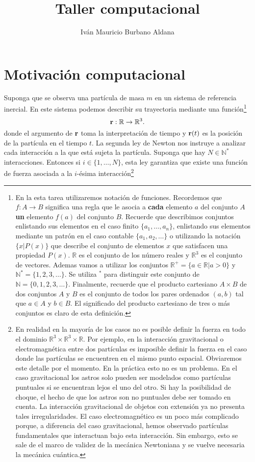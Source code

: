 \documentclass{article}
\title{Taller computacional}
\author{Iván Mauricio Burbano Aldana}
\begin{document}
\maketitle

\section{Motivación computacional}\label{sec:motivacion}

Suponga que se observa una partícula de masa $m$ en un sistema de referencia inercial. En este sistema podemos describir su trayectoria mediante una función\footnote{En la esta tarea utilizaremos notación de funciones. Recordemos que $f:A\rightarrow B$ significa una regla que le asocia a \textbf{cada} elemento $a$ del conjunto $A$ \textbf{un} elemento $f(a)$ del conjunto $B$. Recuerde que describimos conjuntos enlistando sus elementos en el caso finito $\{a_1,\dots,a_n\}$, enlistando sus elementos mediante un patrón  en el caso contable $\{a_1,a_2,\dots\}$ o utilizando la notación $\{x|P(x)\}$ que describe el conjunto de elementos $x$ que satisfacen una propiedad $P(x)$. $\mathbb{R}$ es el conjunto de los número reales y $\mathbb{R}^3$ es el conjunto de vectores. Ademas vamos a utilizar los conjuntos $\mathbb{R}^+=\{a\in\mathbb{R}|a>0\}$ y $\mathbb{N}^*=\{1,2,3,\dots\}$. Se utiliza $^*$ para distinguir este conjunto de $\mathbb{N}=\{0,1,2,3,\dots\}$. Finalmente, recuerde que el producto cartesiano $A\times B$ de dos conjuntos $A$ y $B$ es el conjunto de todos los pares ordenados $(a,b)$ tal que $a\in A$ y $b\in B$. El significado del producto cartesiano de tres o más conjuntos es claro de esta definición.} 
\begin{equation}\label{ec:trayectoria}
\vb{r}:\mathbb{R}\rightarrow\mathbb{R}^3.
\end{equation}
donde el argumento de $\vb{r}$ toma la interpretación de tiempo y $\vb{r}(t)$ es la posición de la partícula en el tiempo $t$. La segunda ley de Newton nos instruye a analizar cada interacción a la que está sujeta la partícula. Suponga que hay $N\in\mathbb{N}^*$ interacciones. Entonces si $i\in\{1,\dots,N\}$, esta ley garantiza que existe una función de fuerza asociada a la $i$-ésima interacción\footnote{En realidad en la mayoría de los casos no es posible definir la fuerza en todo el dominio $\mathbb{R}^3\times\mathbb{R}^3\times\mathbb{R}$. Por ejemplo, en la interacción gravitacional o electromagnética entre dos partículas es imposible definir la fuerza en el caso donde las partículas se encuentren en el mismo punto espacial. Obviaremos este detalle por el momento. En la práctica esto no es un problema. En el caso gravitacional los astros solo pueden ser modelados como partículas puntuales si se encuentran lejos el uno del otro. Si hay la posibilidad de choque, el hecho de que los astros son no puntuales debe ser tomado en cuenta. La interacción gravitacional de objetos con extensión ya no presenta tales irregularidades. El caso electromagnético es un poco más complicado porque, a diferencia del caso gravitacional, hemos observado partículas fundamentales que interactuan bajo esta interacción. Sin embargo, esto se sale de el marco de validez de la mecánica Newtoniana y se vuelve necesaria la mecánica cuántica.}
\end{document}
